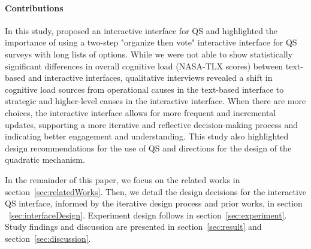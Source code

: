 \paragraph{Contributions}
In this study, proposed an interactive interface for QS and highlighted the importance of using a two-step "organize then vote" interactive interface for QS surveys with long lists of options. While we were not able to show statistically significant differences in overall cognitive load (NASA-TLX scores) between text-based and interactive interfaces, qualitative interviews revealed a shift in cognitive load sources from operational causes in the text-based interface to strategic and higher-level causes in the interactive interface.   When there are more choices, the interactive interface allows for more frequent and incremental updates, supporting a more iterative and reflective decision-making process and indicating better engagement and understanding. This study also highlighted design recommendations for the use of QS and directions for the design of the quadratic mechanism. 

In the remainder of this paper, we focus on the related works in section~\ref{sec:relatedWorks}. Then, we detail the design decisions for the interactive QS interface, informed by the iterative design process and prior works, in section ~\ref{sec:interfaceDesign}. Experiment design follows in section~\ref{sec:experiment}. Study findings and discussion are presented in section~\ref{sec:result} and section~\ref{sec:discussion}.


